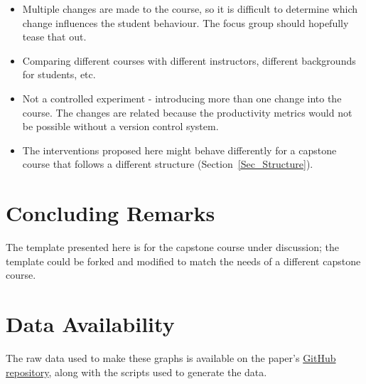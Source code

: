 \documentclass[10pt, conference]{IEEEtran}
\begin{document}
\begin{itemize}
    \item Multiple changes are made to the course, so it is difficult to
    determine which change influences the student behaviour.  The focus group
    should hopefully tease that out.
    \item Comparing different courses with different instructors, different
    backgrounds for students, etc.
    \item Not a controlled experiment - introducing more than one change into
    the course.  The changes are related because the productivity metrics would
    not be possible without a version control system.
    \item The interventions proposed here might behave differently for a
    capstone course that follows a different structure
    (Section~\ref{Sec_Structure}).
\end{itemize}

\section{Concluding Remarks} \label{SecConclusions}

The template presented here is for the capstone course under discussion; the
template could be forked and modified to match the needs of a different capstone
course.

\section{Data Availability}
The raw data used to make these graphs is available on the paper's 
\href{REDACTED Link}{GitHub repository}, along with the scripts used to generate
the data.



\end{document}
